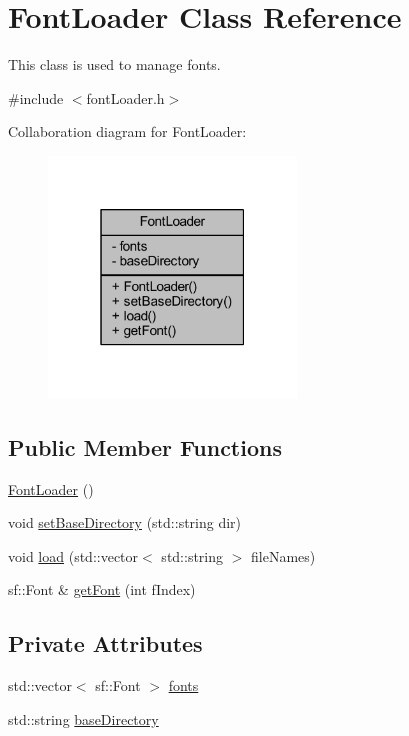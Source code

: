 \hypertarget{class_font_loader}{}\section{Font\+Loader Class Reference}
\label{class_font_loader}


This class is used to manage fonts.  




{\ttfamily \#include $<$font\+Loader.\+h$>$}



Collaboration diagram for Font\+Loader\+:\nopagebreak
\begin{figure}[H]
\begin{center}
\leavevmode
\includegraphics[width=187pt]{class_font_loader__coll__graph}
\end{center}
\end{figure}
\subsection*{Public Member Functions}
\begin{DoxyCompactItemize}
\item 
\hyperlink{class_font_loader_a425b3451baedece1c0cbfa884dd0972a}{Font\+Loader} ()
\item 
void \hyperlink{class_font_loader_a47fd7f5d01ae1c5c687962c3d696f7e0}{set\+Base\+Directory} (std\+::string dir)
\item 
void \hyperlink{class_font_loader_ad78b54b629f95a5940779caa9914e8f7}{load} (std\+::vector$<$ std\+::string $>$ file\+Names)
\item 
sf\+::\+Font \& \hyperlink{class_font_loader_a9927072242d4d8c5b800a471527c9d93}{get\+Font} (int f\+Index)
\end{DoxyCompactItemize}
\subsection*{Private Attributes}
\begin{DoxyCompactItemize}
\item 
std\+::vector$<$ sf\+::\+Font $>$ \hyperlink{class_font_loader_abe3d75dec9d31a88cbfc889df83d2916}{fonts}
\item 
std\+::string \hyperlink{class_font_loader_af5430afdc542c29683315bb331e75efc}{base\+Directory}
\end{DoxyCompactItemize}



